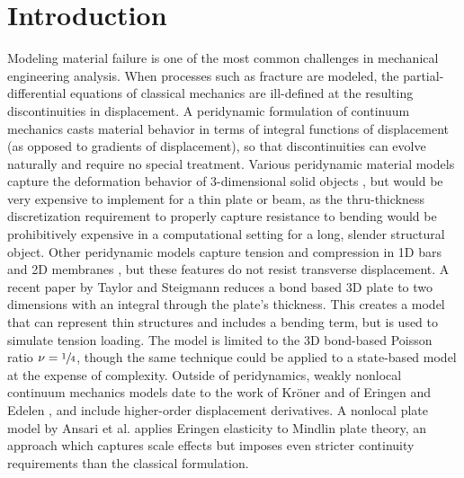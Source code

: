 \documentclass[preprint,review,12pt]{elsarticle}
\begin{document}
\section{Introduction}
Modeling material failure is one of the most common challenges in mechanical engineering analysis. When processes such as fracture are modeled, the partial-differential equations of classical mechanics are ill-defined at the resulting discontinuities in displacement.  A peridynamic formulation of continuum mechanics casts material behavior in terms of integral functions of displacement (as opposed to gradients of displacement), so that discontinuities can evolve naturally and require no special treatment.  Various peridynamic material models capture the deformation behavior of 3-dimensional solid objects \cite{silling2007peridynamic, silling2005meshfree, gerstle2007peridynamic}, but would be very expensive to implement for a thin plate or beam, as the thru-thickness discretization requirement to properly capture resistance to bending would be prohibitively expensive in a computational setting for a long, slender structural object.  Other peridynamic models capture tension and compression in 1D bars \cite{silling2003deformation} and 2D membranes \cite{silling2005peridynamic}, but these features do not resist transverse displacement.  A recent paper by Taylor and Steigmann \cite{taylor2013two} reduces a bond based 3D plate to two dimensions with an integral through the plate's thickness.  This creates a model that can represent thin structures and includes a bending term, but is used to simulate tension loading.  The model is limited to the 3D bond-based Poisson ratio \(\nu=\sfrac{1}{4}\), though the same technique could be applied to a state-based model at the expense of complexity.
Outside of peridynamics, weakly nonlocal continuum mechanics models date to the work of Kr\"oner \cite{kroner1967elasticity} and of Eringen and Edelen \cite{eringen1972nonlocal}, and include higher-order displacement derivatives.  A nonlocal plate model by Ansari et al. \cite{ansari2010nonlocal} applies Eringen elasticity to Mindlin plate theory, an approach which captures scale effects but imposes even stricter continuity requirements than the classical formulation.
\end{document}
